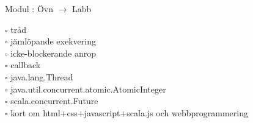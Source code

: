 
Modul : Övn  $\rightarrow$ Labb 
\begin{multicols}{3}\SlideFontTiny
$\square$ tråd \\
$\square$ jämlöpande exekvering \\
$\square$ icke-blockerande anrop \\
$\square$ callback \\
$\square$ java.lang.Thread \\
$\square$ java.util.concurrent.atomic.AtomicInteger \\
$\square$ scala.concurrent.Future \\
$\square$ kort om html+css+javascript+scala.js och webbprogrammering \\     
\end{multicols}
